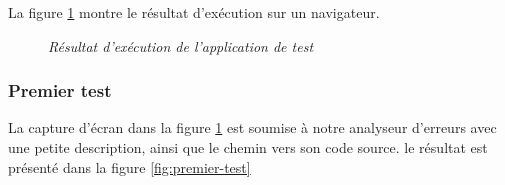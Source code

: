 \documentclass[12pt,a4paper]{report}
\begin{document}
	La figure \ref{fig:simulation-erreur} montre le résultat d'exécution sur un navigateur.
	
	\begin{figure}[H]
		\centering
		\caption{\textit{Résultat d'exécution de l'application de test}}
		\label{fig:simulation-erreur}
	\end{figure}
	
	\subsubsection{Premier test}
	
	La capture d'écran dans la figure \ref{fig:simulation-erreur} est soumise à notre analyseur d'erreurs avec une petite description, ainsi que le chemin vers son code source. le résultat est présenté dans la figure \ref{fig:premier-test}
	
\end{document}
